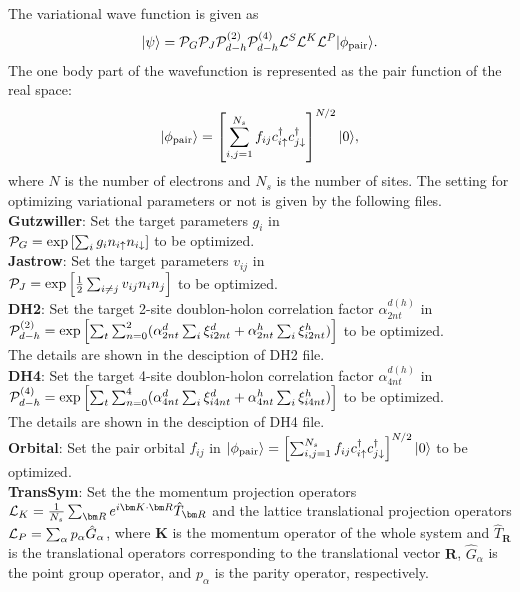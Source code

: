 \begin{description}
~\\The variational wave function is given as
\begin{equation}
|\psi \rangle = {\cal P}_G{\cal P}_J{\cal P}_{d-h}^{(2)}{\cal P}_{d-h}^{(4)}{\cal L}^S{\cal L}^K{\cal L}^P |\phi_{\rm pair} \rangle.
\end{equation}
The one body part of the wavefunction is represented as the pair function of the real space:
\begin{equation}
|\phi_{\rm pair} \rangle = \left[\sum_{i, j=1}^{N_s} f_{ij}c_{i\uparrow}^{\dag}c_{j\downarrow}^{\dag} \right]^{N/2}|0 \rangle,
\end{equation}
where $N$ is the number of electrons and $N_s$ is the number of sites.
The setting for optimizing variational parameters or not is given by the following files.
~\\{\bf Gutzwiller}: Set the target parameters $g_i$ in\\
 ${\cal P}_G=\exp\left[ \sum_i g_i n_{i\uparrow} n_{i\downarrow} \right]$ to be optimized.
~\\{\bf Jastrow}: Set the target parameters $v_{ij}$ in\\
 ${\cal P}_J=\exp\left[\frac{1}{2} \sum_{i\neq j} v_{ij} n_i n_j\right]$ to be optimized.
~\\{\bf DH2}:  Set the target 2-site doublon-holon correlation factor $\alpha_{2nt}^{d(h)}$ in \\
${\cal P}_{d-h}^{(2)}= \exp \left[ \sum_t \sum_{n=0}^2 (\alpha_{2nt}^d \sum_{i}\xi_{i2nt}^d+\alpha_{2nt}^h \sum_{i}\xi_{i2nt}^h)\right]$ to be optimized. \\
The details are shown in the desciption of DH2 file.
~\\{\bf DH4}:  Set the target 4-site doublon-holon correlation factor $\alpha_{4nt}^{d(h)}$ in \\
${\cal P}_{d-h}^{(4)}= \exp \left[ \sum_t \sum_{n=0}^4 (\alpha_{4nt}^d \sum_{i}\xi_{i4nt}^d+\alpha_{4nt}^h \sum_{i}\xi_{i4nt}^h)\right]$ to be optimized.\\
The details are shown in the desciption of DH4 file.
~\\{\bf Orbital}: Set the pair orbital $f_{ij}$ in $|\phi_{\rm pair} \rangle = \left[\sum_{i, j=1}^{N_s} f_{ij}c_{i\uparrow}^{\dag}c_{j\downarrow}^{\dag} \right]^{N/2}|0 \rangle$ to be optimized.
~\\{\bf TransSym}: Set the the momentum projection operators ${\cal L}_K=\frac{1}{N_s}\sum_{{\bm R}}e^{i {\bm K} \cdot{\bm R} } \hat{T}_{\bm R}$ and the lattice translational projection operators ${\cal L}_P=\sum_{\alpha}p_{\alpha} \hat{G}_{\alpha}$, where ${\bm K}$ is the momentum operator of the whole system and $\hat{T}_{\bm R}$ is the translational operators corresponding to the translational vector ${\bm R}$, $\hat{G}_{\alpha}$ is the point group operator, and $p_\alpha$ is the parity operator, respectively.


\end{description}
